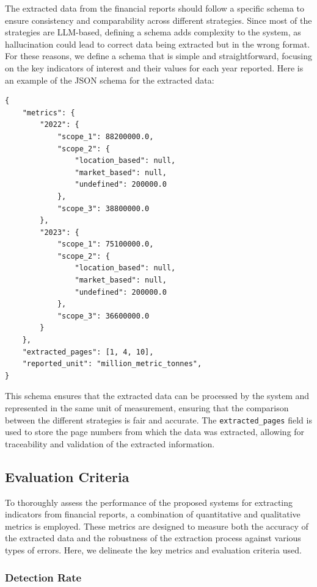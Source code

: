 \documentclass[english, 12pt, a4paper, elec, utf8, a-2b, online]{aaltothesis}
\begin{document}
The extracted data from the financial reports should follow a specific schema to ensure consistency and comparability across different strategies.
Since most of the strategies are \ac{LLM}-based, defining a schema adds complexity to the system, as hallucination could lead to correct data being extracted but in the wrong format.
For these reasons, we define a schema that is simple and straightforward, focusing on the key indicators of interest and their values for each year reported.
Here is an example of the \ac{JSON} schema for the extracted data:

\begin{verbatim}
{
    "metrics": {
        "2022": {
            "scope_1": 88200000.0,
            "scope_2": {
                "location_based": null,
                "market_based": null,
                "undefined": 200000.0
            },
            "scope_3": 38800000.0
        },
        "2023": {
            "scope_1": 75100000.0,
            "scope_2": {
                "location_based": null,
                "market_based": null,
                "undefined": 200000.0
            },
            "scope_3": 36600000.0
        }
    },
    "extracted_pages": [1, 4, 10],
    "reported_unit": "million_metric_tonnes",
}
\end{verbatim}

This schema ensures that the extracted data can be processed by the system and represented in the same unit of measurement, ensuring that the comparison between the different strategies is fair and accurate.
The \texttt{extracted\_pages} field is used to store the page numbers from which the data was extracted, allowing for traceability and validation of the extracted information.

\subsection{Evaluation Criteria}
\label{sec:evaluation_criteria}

To thoroughly assess the performance of the proposed systems for extracting indicators from financial reports, a combination of quantitative and qualitative metrics is employed.
These metrics are designed to measure both the accuracy of the extracted data and the robustness of the extraction process against various types of errors.
Here, we delineate the key metrics and evaluation criteria used.

\subsubsection{Detection Rate}
\end{document}
